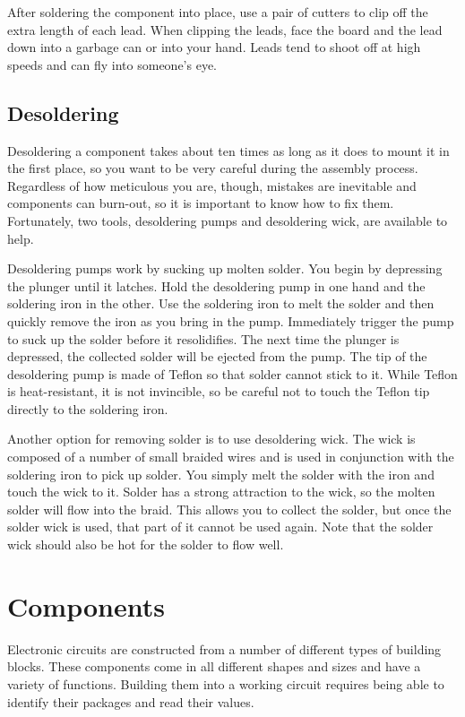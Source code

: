 After soldering the component into place, use a pair of cutters to
clip off the extra length of each lead. When clipping the leads, face
the board and the lead down into a garbage can or into your
hand. Leads tend to shoot off at high speeds and can fly into
someone's eye.

\subsection{Desoldering}

Desoldering a component takes about ten times as long as it does to
mount it in the first place, so you want to be very careful during the
assembly process. Regardless of how meticulous you are, though,
mistakes are inevitable and components can burn-out, so it is
important to know how to fix them. Fortunately, two tools, desoldering
pumps and desoldering wick, are available to help.

Desoldering pumps work by sucking up molten solder. You begin by
depressing the plunger until it latches. Hold the desoldering pump in
one hand and the soldering iron in the other. Use the soldering iron
to melt the solder and then quickly remove the iron as you bring in
the pump. Immediately trigger the pump to suck up the solder before it
resolidifies. The next time the plunger is depressed, the collected
solder will be ejected from the pump. The tip of the desoldering pump
is made of Teflon so that solder cannot stick to it. While Teflon is
heat-resistant, it is not invincible, so be careful not to touch the
Teflon tip directly to the soldering iron.

Another option for removing solder is to use desoldering wick. The
wick is composed of a number of small braided wires and is used in
conjunction with the soldering iron to pick up solder. You simply melt
the solder with the iron and touch the wick to it. Solder has a strong
attraction to the wick, so the molten solder will flow into the
braid. This allows you to collect the solder, but once the solder wick
is used, that part of it cannot be used again.  Note that the solder
wick should also be hot for the solder to flow well.

\section{Components}

Electronic circuits are constructed from a number of different types
of building blocks. These components come in all different shapes and
sizes and have a variety of functions. Building them into a working
circuit requires being able to identify their packages and read their
values.

